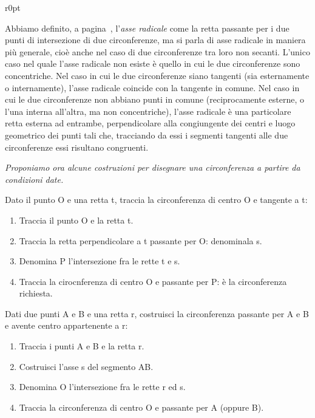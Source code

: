 \begin{wrapfigure}{r}{0pt}
  \centering
\end{wrapfigure}
Abbiamo definito, a pagina~\pageref{def:asse_radicale}, l'\emph{asse 
radicale} come la retta passante per i due punti di intersezione di 
due circonferenze, ma si parla di asse radicale in maniera più 
generale, cioè anche nel caso di due circonferenze tra loro non 
secanti. L'unico caso nel quale l'asse radicale non esiste è quello 
in cui le due circonferenze sono concentriche.
Nel caso in cui le due circonferenze siano tangenti (sia esternamente 
o internamente), l'asse radicale coincide con la tangente in comune.
Nel caso in cui le due circonferenze non abbiano punti in comune 
(reciprocamente esterne, o l'una interna all'altra, ma non 
concentriche), l'asse radicale è una particolare retta esterna ad 
entrambe, perpendicolare alla congiungente dei centri e luogo 
geometrico dei punti tali che, tracciando da essi i segmenti tangenti 
alle due circonferenze essi risultano congruenti.

\textit{Proponiamo ora alcune costruzioni per disegnare una circonferenza a 
partire da condizioni date.}

\begin{procedura}
  Dato il punto O e una retta t, traccia la circonferenza di centro O e 
tangente a t:
  \begin{enumerate} [nosep]
    \item 
    Traccia il punto O e la retta t.
    \item 
    Traccia la retta perpendicolare a t passante per O: denominala 
s.
    \item
    Denomina P l'intersezione fra le rette t e s.
    \item 
    Traccia la cirocnferenza di centro O e passante per P: è la 
circonferenza richiesta.
  \end{enumerate}
\end{procedura}

\begin{procedura}
  Dati due punti A e B e una retta r, costruisci la circonferenza 
passante per A e B e avente centro appartenente a r:
  \begin{enumerate} [nosep]
    \item 
    Traccia i punti A e B e la retta r.
    \item 
    Costruisci l'asse s del segmento AB.
    \item 
    Denomina O l'intersezione fra le rette r ed s.
    \item 
    Traccia la circonferenza di centro O e passante per A (oppure 
B). 
  \end{enumerate}
\end{procedura}

